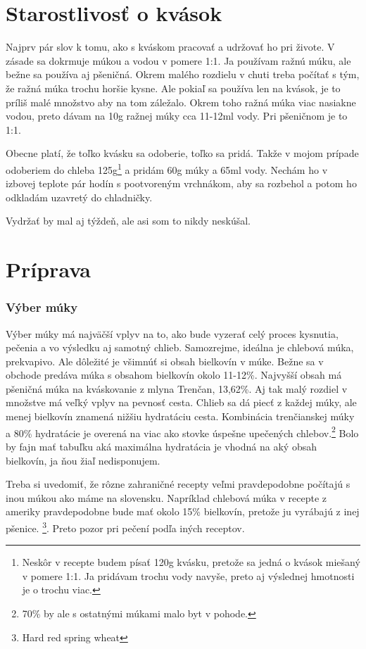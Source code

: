 \documentclass[a4paper,12pt]{article}
\begin{document}
\section{Starostlivosť o kvások}
Najprv pár slov k tomu, ako s kváskom pracovať a udržovať ho pri živote. V zásade sa dokrmuje múkou a vodou v pomere 1:1. Ja používam ražnú múku, ale bežne sa používa aj pšeničná. Okrem malého rozdielu v chuti treba počítať s tým, že ražná múka trochu horšie kysne. Ale pokiaľ sa používa len na kvások, je to príliš malé množstvo aby na tom záležalo. Okrem toho ražná múka viac nasiakne vodou, preto dávam na 10g ražnej múky cca 11-12ml vody. Pri pšeničnom je to 1:1.

Obecne platí, že toľko kvásku sa odoberie, toľko sa pridá. Takže v mojom prípade odoberiem do chleba 125g\footnote{Neskôr v recepte budem písať 120g kvásku, pretože sa jedná o kvások miešaný v pomere 1:1. Ja pridávam trochu vody navyše, preto aj výslednej hmotnosti je o trochu viac.} a pridám 60g múky a 65ml vody. Nechám ho v izbovej teplote pár hodín s pootvoreným vrchnákom, aby sa rozbehol a potom ho odkladám uzavretý do chladničky.

Vydržať by mal aj týždeň, ale asi som to nikdy neskúšal.

\section{Príprava}

\subsubsection{Výber múky}
Výber múky má najväčší vplyv na to, ako bude vyzerať celý proces kysnutia, pečenia a vo výsledku aj samotný chlieb. Samozrejme, ideálna je chlebová múka, prekvapivo. Ale dôležité je všimnúť si obsah bielkovín v múke. Bežne sa v obchode predáva múka s obsahom bielkovín okolo 11-12\%. Najvyšší obsah má pšeničná múka na kváskovanie z mlyna Trenčan, 13,62\%. Aj tak malý rozdiel v množstve má veľký vplyv na pevnosť cesta. Chlieb sa dá piecť z každej múky, ale menej bielkovín znamená nižšiu hydratáciu cesta. Kombinácia trenčianskej múky a 80\% hydratácie je overená na viac ako stovke úspešne upečených chlebov.\footnote{70\% by ale s ostatnými múkami malo byt v pohode.} Bolo by fajn mať tabuľku aká maximálna hydratácia je vhodná na aký obsah bielkovín, ja ňou žiaľ nedisponujem.

Treba si uvedomiť, že rôzne zahraničné recepty veľmi pravdepodobne počítajú s inou múkou ako máme na slovensku. Napríklad chlebová múka v recepte z ameriky pravdepodobne bude mať okolo 15\% bielkovín, pretože ju vyrábajú z inej pšenice. \footnote{Hard red spring wheat}. Preto pozor pri pečení podľa iných receptov.
\end{document}
